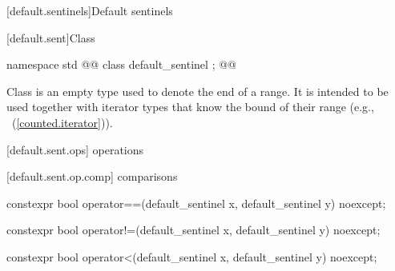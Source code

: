 \begin{addedblock}
[default.sentinels]{Default sentinels}

[default.sent]{Class }

%
\begin{itemdecl}
namespace std { @@
  class default_sentinel { };
}@\newtxt{\}\}}@
\end{itemdecl}

\pnum
Class  is an empty type used to denote the end of a
range. It is intended to be used together with iterator types that know the bound
of their range (e.g., ~(\ref{counted.iterator})).

[default.sent.ops]{ operations}

[default.sent.op.comp]{ comparisons}

%
%
\begin{itemdecl}
constexpr bool operator==(default_sentinel x, default_sentinel y) noexcept;
\end{itemdecl}

\begin{itemdescr}
\pnum
\returns {}
\end{itemdescr}

%
%
\begin{itemdecl}
constexpr bool operator!=(default_sentinel x, default_sentinel y) noexcept;
\end{itemdecl}

\begin{itemdescr}
\pnum
\returns {}
\end{itemdescr}

%
%
\begin{itemdecl}
constexpr bool operator<(default_sentinel x, default_sentinel y) noexcept;
\end{itemdecl}

\begin{itemdescr}
\pnum
\returns {}
\end{itemdescr}


\end{addedblock}
